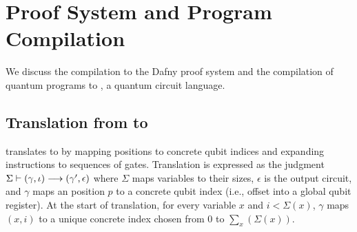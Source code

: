 \section{\qafny Proof System and Program Compilation}

We discuss the \qafny compilation to the Dafny proof system and the compilation of quantum programs to \sqir, a quantum circuit language.

\subsection{Translation from \qafny to \sqir}\label{sec:vqir-compilation}

\newcommand{\tget}{\texttt{get}}
\newcommand{\tstart}{\texttt{start}}
\newcommand{\tfst}{\texttt{fst}}
\newcommand{\tsnd}{\texttt{snd}}
\newcommand{\tucom}[1]{\texttt{ucom}~{#1}}
\newcommand{\tif}{\texttt{if}}
\newcommand{\tthen}{\texttt{then}}
\newcommand{\telse}{\texttt{else}}
\newcommand{\tlet}{\texttt{let}}
\newcommand{\tin}{\texttt{in}}

\name translates \oqasm to \sqir by mapping \oqasm positions to \sqir 
concrete qubit indices and expanding \oqasm instructions to sequences
of \sqir gates.
%
%
Translation is expressed as the judgment
$\Sigma\vdash (\gamma,\iota) \longrightarrow
(\gamma',\epsilon)$ where $\Sigma$ maps \oqasm variables to their sizes, 
$\epsilon$ is the output \sqir circuit, and $\gamma$ maps an \oqasm 
position $p$ to a \sqir concrete qubit index (i.e., offset into a 
global qubit register).  At the start of translation, for every
variable $x$ and $i < \Sigma(x)$, $\gamma$ maps $(x,i)$ to a unique
concrete index chosen from 0 to $\sum_{x}(\Sigma(x))$.

